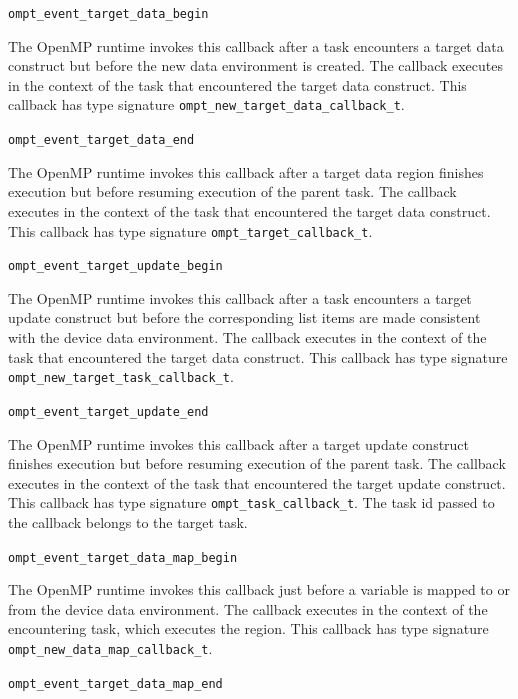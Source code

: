 \documentclass{article}
\begin{document}
\begin{description}

\item \verb|ompt_event_target_data_begin|

  The OpenMP runtime invokes this callback after a task encounters a target data construct but before the new data environment is created.
  The callback executes in the context of the task that encountered the target data construct.
  This callback has type signature \verb|ompt_new_target_data_callback_t|.

\item \verb|ompt_event_target_data_end|

  The OpenMP runtime invokes this callback after a target data region finishes execution but before resuming execution of the parent task.
  The callback executes in the context of the task that encountered the target data construct.
  This callback has type signature \verb|ompt_target_callback_t|.

\item \verb|ompt_event_target_update_begin|

  The OpenMP runtime invokes this callback after a task encounters a target update construct but before the corresponding
  list items are made consistent with the device data environment.
  The callback executes in the context of the task that encountered the target data construct.
  This callback has type signature \verb|ompt_new_target_task_callback_t|.

\item \verb|ompt_event_target_update_end|

  The OpenMP runtime invokes this callback after a target update construct finishes execution but before resuming execution of the parent task.
  The callback executes in the context of the task that encountered the target update construct.
  This callback has type signature \verb|ompt_task_callback_t|. The task id passed to the callback belongs to the target task.

\item \verb|ompt_event_target_data_map_begin|

  The OpenMP runtime invokes this callback just before a variable is mapped to or from the device data environment.
  The callback executes in the context of the encountering task, which executes the region.
  This callback has type signature \verb|ompt_new_data_map_callback_t|.

\item \verb|ompt_event_target_data_map_end|


\end{description}
\end{document}
